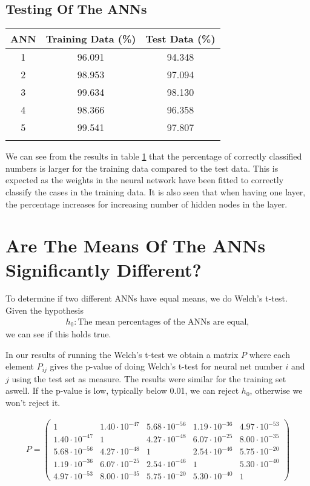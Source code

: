 \documentclass[11pt,a4paper]{article}
\begin{document}
\subsection{Testing Of The ANNs}

\begin{table}
\centering
\begin{tabular}{ c c c }\label{tab:meanPercentage}
ANN & Training Data (\%) & Test Data (\%)
 \\
  \hline  
  1 & 96.091 & 94.348\\
  2 & 98.953 & 97.094\\
  3 & 99.634 & 98.130\\
  4 & 98.366 & 96.358\\
  5 & 99.541 & 97.807\\
  \hline\\
\end{tabular}
\end{table}

We can see from the results in table \ref{tab:meanPercentage} that the percentage of correctly classified numbers is larger for the training data compared to the test data. This is expected as the weights in the neural network have been fitted to correctly classify the cases in the training data. It is also seen that when having one layer, the percentage increases for increasing number of hidden nodes in the layer.

\section{Are The Means Of The ANNs Significantly Different?}
To determine if two different ANNs have equal means, we do Welch's t-test. Given the hypothesis
\begin{align}
h_0: \textrm{The mean percentages of the ANNs are equal},
\end{align}
we can see if this holds true. 

In our results of running the Welch's t-test we obtain a matrix $P$ where each element $P_{ij}$ gives the p-value of doing Welch's t-test for neural net number $i$ and $j$ using the test set as measure. The results were similar for the training set aswell. If the p-value is low, typically below 0.01, we can reject $h_0$, otherwise we won't reject it.

\begin{align} \label{tab:welchTable}
P = \begin{pmatrix}
1 & 1.40\cdot10^{-47} & 5.68\cdot10^{-56} & 1.19\cdot10^{-36} & 4.97\cdot10^{-53}\\
1.40\cdot10^{-47} & 1 & 4.27\cdot10^{-48} & 6.07\cdot10^{-25} & 8.00\cdot10^{-35}\\
5.68\cdot10^{-56} & 4.27\cdot10^{-48} & 1 & 2.54\cdot10^{-46} & 5.75\cdot10^{-20}\\
1.19\cdot10^{-36} & 6.07\cdot10^{-25} & 2.54\cdot10^{-46} & 1 & 5.30\cdot10^{-40}\\
4.97\cdot10^{-53} & 8.00\cdot10^{-35} & 5.75\cdot10^{-20} & 5.30\cdot10^{-40} & 1
\end{pmatrix}
\end{align}
\end{document}
